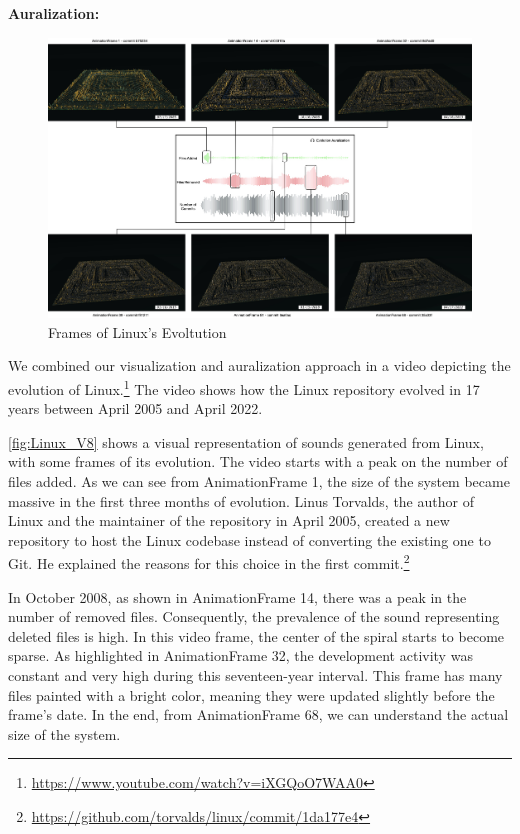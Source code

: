 \bigbreak
\textbf{Auralization:}
\begin{landscape}
    \Huge 
    \begin{figure}[ht]
    \includegraphics[width=\linewidth]{LinuxAuralization.jpg}
    \caption{Frames of Linux's Evoltution} 
    \label{fig:Linux_V8}
\end{figure}
\end{landscape}
We combined our visualization and auralization approach in a video depicting the evolution of Linux.\footnote{\url{https://www.youtube.com/watch?v=iXGQoO7WAA0}} The video shows how the Linux repository evolved in 17 years between April 2005 and April 2022. 

\autoref{fig:Linux_V8} shows a visual representation of sounds generated from Linux, with some frames of its evolution. The video starts with a peak on the number of files added. As we can see from AnimationFrame 1, the size of the system became massive in the first three months of evolution. Linus Torvalds, the author of Linux and the maintainer of the repository in April 2005, created a new repository to host the Linux codebase instead of converting the existing one to Git. He explained the reasons for this choice in the first commit.\footnote{\url{https://github.com/torvalds/linux/commit/1da177e4}}

In October 2008, as shown in AnimationFrame 14, there was a peak in the number of removed files. Consequently, the prevalence of the sound representing deleted files is high. In this video frame, the center of the spiral starts to become sparse. As highlighted in AnimationFrame 32, the development activity was constant and very high during this 
seventeen-year interval. This frame has many files painted with a bright color, meaning they were updated slightly before the frame's date. 
In the end, from AnimationFrame 68, we can understand the actual size of the system.



